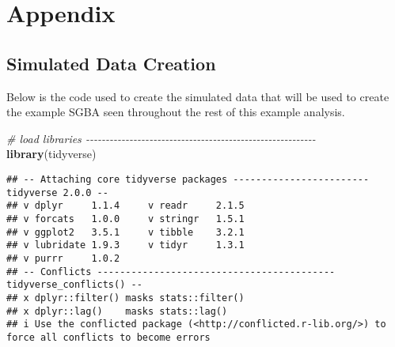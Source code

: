 \documentclass[
]{book}
\newenvironment{Shaded}{\begin{snugshade}}{\end{snugshade}}
\newcommand{\CommentTok}[1]{\textcolor[rgb]{0.56,0.35,0.01}{\textit{#1}}}
\newcommand{\FunctionTok}[1]{\textcolor[rgb]{0.13,0.29,0.53}{\textbf{#1}}}
\newcommand{\NormalTok}[1]{#1}
\begin{document}
\chapter*{Appendix}\label{appendix}

\section{Simulated Data Creation}\label{simulated-data-creation}

Below is the code used to create the simulated data that will be used to create the example SGBA seen throughout the rest of this example analysis.

\begin{Shaded}
\begin{Highlighting}[]
\CommentTok{\# load libraries {-}{-}{-}{-}{-}{-}{-}{-}{-}{-}{-}{-}{-}{-}{-}{-}{-}{-}{-}{-}{-}{-}{-}{-}{-}{-}{-}{-}{-}{-}{-}{-}{-}{-}{-}{-}{-}{-}{-}{-}{-}{-}{-}{-}{-}{-}{-}{-}{-}{-}{-}{-}{-}{-}{-}{-}{-}{-}}
\FunctionTok{library}\NormalTok{(tidyverse)}
\end{Highlighting}
\end{Shaded}

\begin{verbatim}
## -- Attaching core tidyverse packages ------------------------ tidyverse 2.0.0 --
## v dplyr     1.1.4     v readr     2.1.5
## v forcats   1.0.0     v stringr   1.5.1
## v ggplot2   3.5.1     v tibble    3.2.1
## v lubridate 1.9.3     v tidyr     1.3.1
## v purrr     1.0.2     
## -- Conflicts ------------------------------------------ tidyverse_conflicts() --
## x dplyr::filter() masks stats::filter()
## x dplyr::lag()    masks stats::lag()
## i Use the conflicted package (<http://conflicted.r-lib.org/>) to force all conflicts to become errors
\end{verbatim}
\end{document}
